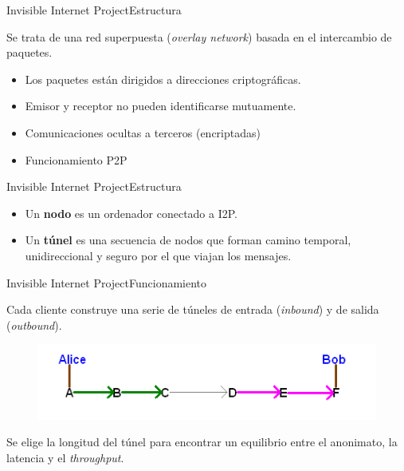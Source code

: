\documentclass[spanish]{beamer}
\begin{document}
\begin{frame}{Invisible Internet Project}{Estructura}
	

Se trata de una red superpuesta (\textit{overlay network}) basada en el intercambio de paquetes.

\begin{itemize}
	\item Los paquetes están dirigidos a direcciones criptográficas.
	\item Emisor y receptor no pueden identificarse mutuamente.
	\item Comunicaciones ocultas a terceros (encriptadas)
	\item Funcionamiento P2P
\end{itemize}
	
\end{frame}



\begin{frame}{Invisible Internet Project}{Estructura}

\begin{itemize}
\item Un \textbf{nodo} es un ordenador conectado a I2P.
\item Un \textbf{túnel} es una secuencia de nodos que forman camino temporal, unidireccional y seguro por el que viajan los mensajes.
\end{itemize}

	
\end{frame}



\begin{frame}{Invisible Internet Project}{Funcionamiento}

Cada cliente construye una serie de túneles de entrada (\textit{inbound}) y de salida (\textit{outbound}).


\begin{figure}
	\centering
	\includegraphics{img/alice_bob_tunnel}
\end{figure}

Se elige la longitud del túnel para encontrar un equilibrio entre el anonimato, la latencia y el \textit{throughput}.

\end{frame}
\end{document}
